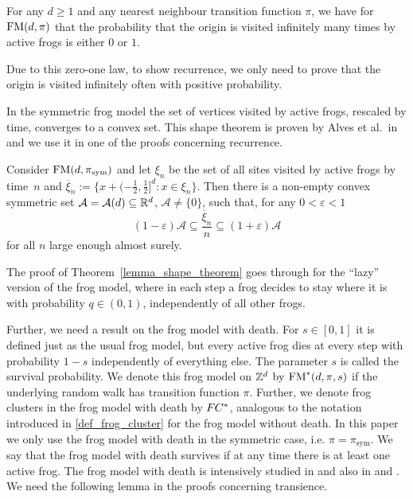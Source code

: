 \begin{thm}[\cite{KZ17}]\label{lemma_zero_one_law}
For any $d \geq 1$ and any nearest neighbour transition function $\pi$,
we have for $\operatorname{FM}(d,\pi)$ that the probability that the origin is visited infinitely many times by active frogs is either $0$ or $1$.
\end{thm}

Due to this zero-one law, to show recurrence, we only need to prove that the origin is visited infinitely often with positive probability. 

In the symmetric frog model the set of vertices visited by active frogs, rescaled by time, converges to a convex set. This shape theorem is proven by Alves et al.~in \cite[Theorem 1.1]{AMP02} and we use it in one of the proofs concerning recurrence.

\begin{thm}\label{lemma_shape_theorem}
Consider $\operatorname{FM}(d,\pi_{\text{sym}})$ and let $\xi_n$ be the set of all sites visited by active frogs by time~$n$ and $\overline{\xi}_n := \{x + (-\frac12, \frac12]^d \colon x \in \xi_n\}$. Then there is a non-empty convex symmetric set $\mathcal{A}=\mathcal{A}(d) \subseteq \mathbb{R}^d$, $\mathcal{A} \neq \{0\}$, such that, for any $0 < \varepsilon < 1$
 \begin{equation*}
  (1- \varepsilon) \mathcal{A} \subseteq \frac{\overline{\xi}_n}{n} \subseteq (1+ \varepsilon) \mathcal{A}
 \end{equation*}
for all $n$ large enough almost surely. 
\end{thm}

\begin{remark} \label{remark_shape}
The proof of Theorem~\ref{lemma_shape_theorem} goes through for the ``lazy'' version of the frog model, where in each step a frog decides to stay where it is with probability $q \in (0,1)$, independently of all other frogs.
\end{remark}

Further, we need a result on the frog model with death. For $s \in [0,1]$ it is defined just as the usual frog model, but every active frog dies at every step with probability $1-s$ independently of everything else. The parameter $s$ is called the survival probability. We denote this frog model on $\mathbb{Z}^d$ by $\operatorname{FM}^*(d,\pi,s)$ if the underlying random walk has transition function $\pi$. Further, we denote frog clusters in the frog model with death by $F\hspace{-0.04em}C^*$, analogous to the notation introduced in \eqref{def_frog_cluster} for the frog model without death. In this paper we only use the frog model with death in the symmetric case, i.e. $\pi= \pi_{\text{sym}}$. We say that the frog model with death survives if at any time there is at least one active frog.
The frog model with death is intensively studied in \cite{AMP02pt} and also in \cite{FMS04} and \cite{LMP05}. We need the following lemma in the proofs concerning transience. 

